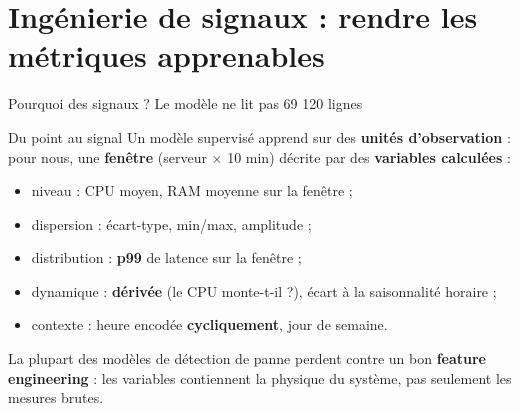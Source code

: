 \section{Ingénierie de signaux : rendre les métriques apprenables}

\begin{frame}{Pourquoi des signaux ? Le modèle ne lit pas 69 120 lignes}
\begin{block}{Du point au signal}
Un modèle supervisé apprend sur des \textbf{unités d'observation} :
pour nous, une \textbf{fenêtre} (serveur $\times$ 10 min) décrite par
des \textbf{variables calculées} :
\begin{itemize}
\item niveau : CPU moyen, RAM moyenne sur la fenêtre ;
\item dispersion : écart-type, min/max, amplitude ;
\item distribution : \textbf{p99} de latence sur la fenêtre ;
\item dynamique : \textbf{dérivée} (le CPU monte-t-il ?), écart à la
saisonnalité horaire ;
\item contexte : heure encodée \textbf{cycliquement}, jour de semaine.
\end{itemize}
\end{block}
\begin{kbox}
La plupart des modèles de détection de panne perdent contre un bon
\textbf{feature engineering} : les variables contiennent la physique
du système, pas seulement les mesures brutes.
\end{kbox}
\end{frame}

